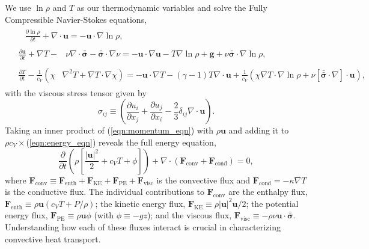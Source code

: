 \documentclass[aps, prfluids, onecolumn, notitlepage, nofootinbib, groupedaddress, amsfonts, amssymb, amsmath]{revtex4-1}
\newcommand{\Div}[1]{\ensuremath{\nabla\cdot\left( #1\right)}}
\newcommand{\grad}{\ensuremath{\nabla}}
\newcommand{\lilstressT}{\ensuremath{\bm{\bar{\bar{\sigma}}}}}
\begin{document}
We use $\ln \rho$ and $T$ as our thermodynamic variables and solve the Fully 
Compressible Navier-Stokes equations,
\begin{align}
&\begin{aligned}
&\frac{\partial \ln\rho}{\partial t} + \grad\cdot\bm{u} 
    = -\bm{u}\cdot\grad\ln\rho,
	\label{eqn:continuity_eqn}
\end{aligned}\\
&\begin{aligned}
\frac{\partial\bm{u}}{\partial t} + \grad T - 
&\nu\grad\cdot\lilstressT - \lilstressT\cdot\grad\nu =
-\bm{u}\cdot\grad\bm{u} - T\grad\ln\rho + \bm{g} + 
\nu\lilstressT\cdot\grad\ln\rho,
\label{eqn:momentum_eqn}
\end{aligned}\\
&\begin{aligned}
\frac{\partial T}{\partial t} -\frac{1}{c_V}\left(\right.\chi&\left.
    \grad^2 T + \grad T\cdot\grad\chi\right) =
	-\bm{u}\cdot\grad T - (\gamma-1)T\grad\cdot{\bm{u}}
	+ \frac{1}{c_V}\left(\chi\grad T \cdot\grad\ln\rho +
	\nu\left[\lilstressT\cdot\nabla\right]\cdot\bm{u}\right), 
	\label{eqn:energy_eqn}
\end{aligned}
\end{align}
with the viscous stress tensor given by
\begin{equation}
\sigma_{ij} \equiv \left(\frac{\partial u_i}{\partial x_j} + 
\frac{\partial u_j}{\partial x_i} - \frac{2}{3}\delta_{ij}\grad\cdot\bm{u}\right).
	\label{eqn:stress_tensor}
\end{equation}
Taking an inner product of
(\ref{eqn:momentum_eqn}) with $\rho\bm{u}$ and adding it to 
$\rho c_V\times$(\ref{eqn:energy_eqn}) reveals the full energy equation,
\begin{equation}
\frac{\partial}{\partial t}\left(\rho\left[\frac{|\bm{u}|^2}{2} + c_V T + \phi\right]\right) +
\Div{\bm{F}_{\text{conv}} + \bm{F}_{\text{cond}}} = 0,
	\label{eqn:energy_eqn_full}
\end{equation}
where
$
\bm{F}_{\text{conv}} \equiv \bm{F}_{\text{enth}} + \bm{F}_{\text{KE}} + \bm{F}_{\text{PE}} + \bm{F}_{\text{visc}}
$
is the convective flux and $\bm{F}_{\text{cond}} = -\kappa \grad T$
is the conductive flux.
The individual contributions to $\bm{F}_{\text{conv}}$ are the enthalpy flux, 
$\bm{F}_{\text{enth}} \equiv \rho\bm{u}(c_V T + P/\rho)$;
the kinetic energy flux, 
$\bm{F}_{\text{KE}} \equiv \rho|\bm{u}|^2\bm{u}/2$;
the potential energy flux,
$\bm{F}_{\text{PE}} \equiv \rho\bm{u}\phi$ (with $\phi \equiv -gz$);
and the viscous flux, 
$\bm{F}_{\text{visc}} \equiv -\rho\nu\bm{u}\cdot\lilstressT$.
Understanding how each of these fluxes interact  
is crucial in characterizing convective heat transport.
\end{document}
